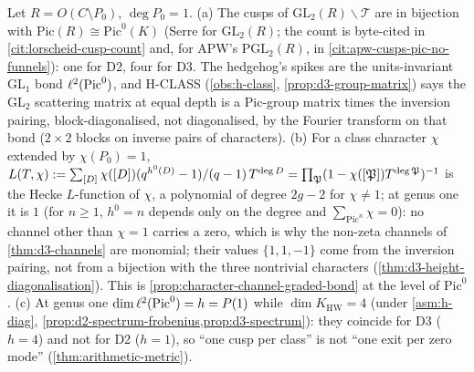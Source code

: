 \begin{proposition}
\label{prop:cusps-are-class-group-bond}
Let $R = O(C\setminus P_0)$, $\deg P_0 = 1$. (a) The cusps of $\mathrm{GL}_2(R)\backslash\mathcal T$ are in bijection with
$\mathrm{Pic}(R)\cong\mathrm{Pic}^0(K)$ (Serre for $\mathrm{GL}_2(R)$; the count is byte-cited in \cref{cit:lorscheid-cusp-count} and, for
APW's $\mathrm{PGL}_2(R)$, in \cref{cit:apw-cusps-pic-no-funnels}): one for D2, four for D3. The
hedgehog's spikes are the units-invariant GL$_1$ bond $\ell^2(\mathrm{Pic}^0)$, and H-CLASS (\cref{obs:h-class},
\cref{prop:d3-group-matrix}) says the GL$_2$ scattering matrix at equal depth is a $\mathrm{Pic}$-group matrix times
the inversion pairing, block-diagonalised, not diagonalised, by the Fourier transform on that bond ($2\times2$
blocks on inverse pairs of characters). (b) For a class character $\chi$
extended by $\chi(P_0) = 1$, $L(T,\chi) := \sum_{[D]}\chi([D])(q^{h^0(D)}-1)/(q-1)\,T^{\deg D} =
\prod_{\mathfrak P}(1-\chi([\mathfrak P])T^{\deg\mathfrak P})^{-1}$ is the Hecke $L$-function of $\chi$, a polynomial of
degree $2g-2$ for $\chi\ne1$; at genus one it is $1$ (for $n\ge1$, $h^0 = n$ depends only on the degree and
$\sum_{\mathrm{Pic}^n}\chi = 0$): no channel other than $\chi = 1$ carries a zero, which is why the non-zeta channels of
\cref{thm:d3-channels} are monomial; their values $\{1,1,-1\}$ come from the inversion pairing, not from a
bijection with the three nontrivial characters (\cref{thm:d3-height-diagonalisation}). This is
\cref{prop:character-channel-graded-bond} at the level of $\mathrm{Pic}^0$. (c) At genus one $\dim\ell^2(\mathrm{Pic}^0) = h = P(1)$ while $\dim K_{\mathrm{HW}} = 4$ (under \cref{asm:h-diag},
\cref{prop:d2-spectrum-frobenius,prop:d3-spectrum}): they coincide for D3 ($h = 4$) and not for D2 ($h = 1$), so ``one cusp per class'' is not ``one exit per zero mode''
(\cref{thm:arithmetic-metric}).
\end{proposition}

